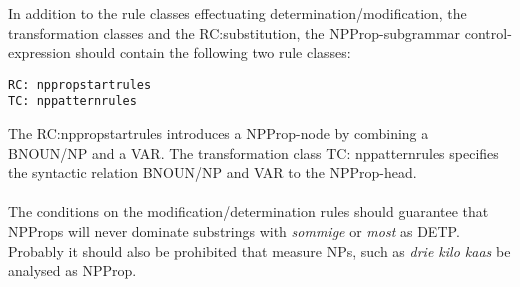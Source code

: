 In addition to the rule classes effectuating determination/modification, the
transformation classes and the RC:substitution, the
NPProp-subgrammar control-expression should contain the following two rule
classes:
\begin{verbatim}
RC: nppropstartrules
TC: nppatternrules
\end{verbatim}
The RC:nppropstartrules introduces a NPProp-node by combining a BNOUN/NP and a
VAR. The transformation class TC: nppatternrules specifies the syntactic
relation BNOUN/NP and VAR to the NPProp-head. \\ \\
The conditions on the modification/determination rules should guarantee that
NPProps will never dominate substrings with {\em sommige} or {\em most} as
DETP. Probably it should also be prohibited that measure NPs, such as {\em drie
kilo kaas} be analysed as NPProp. 

